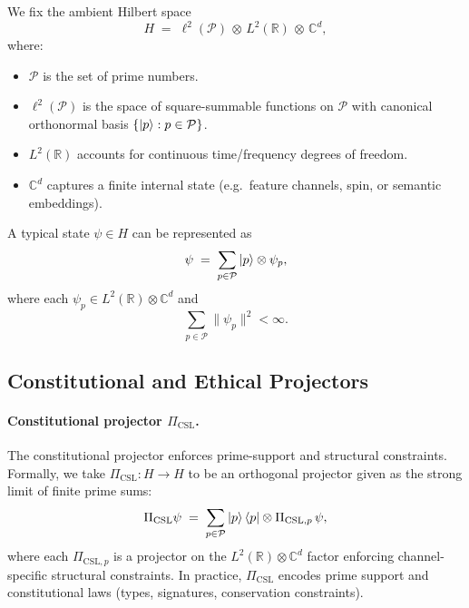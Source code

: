 \documentclass[11pt]{article}
\begin{document}
We fix the ambient Hilbert space
\begin{equation}
  H \;=\; \ell^2(\mathcal{P}) \,\otimes\, L^2(\mathbb{R}) \,\otimes\, \mathbb{C}^d,
\end{equation}
where:
\begin{itemize}[leftmargin=1.5em]
  \item $\mathcal{P}$ is the set of prime numbers.
  \item $\ell^2(\mathcal{P})$ is the space of square-summable functions on $\mathcal{P}$ with canonical orthonormal basis $\{ \ket{p} : p \in \mathcal{P} \}$.
  \item $L^2(\mathbb{R})$ accounts for continuous time/frequency degrees of freedom.
  \item $\mathbb{C}^d$ captures a finite internal state (e.g.\ feature channels, spin, or semantic embeddings).
\end{itemize}

A typical state $\psi \in H$ can be represented as
\begin{equation}
  \psi \;=\; \sum_{p \in \mathcal{P}} \ket{p} \otimes \psi_p,
\end{equation}
where each $\psi_p \in L^2(\mathbb{R}) \otimes \mathbb{C}^d$ and
\[
  \sum_{p \in \mathcal{P}} \|\psi_p\|^2 < \infty.
\]

\subsection{Constitutional and Ethical Projectors}

\paragraph{Constitutional projector $\Pi_{\text{CSL}}$.}

The constitutional projector enforces prime-support and structural constraints.
Formally, we take $\Pi_{\text{CSL}} : H \to H$ to be an orthogonal projector given as the strong limit of finite prime sums:
\begin{equation}
  \Pi_{\text{CSL}} \psi \;=\;
  \sum_{p \in \mathcal{P}} \ket{p}\bra{p} \otimes \Pi_{\text{CSL},p}\,\psi,
\end{equation}
where each $\Pi_{\text{CSL},p}$ is a projector on the $L^2(\mathbb{R}) \otimes \mathbb{C}^d$ factor enforcing channel-specific structural constraints.
In practice, $\Pi_{\text{CSL}}$ encodes prime support and constitutional laws (types, signatures, conservation constraints).
\end{document}
